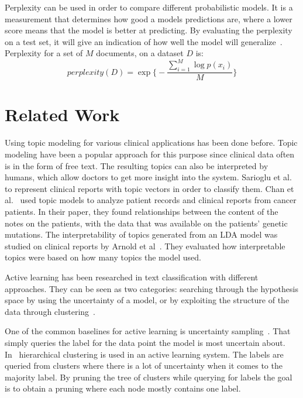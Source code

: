 Perplexity can be used in order to compare different probabilistic models. 
It is a measurement that determines how good a models predictions are, where a lower score means that the model is better at predicting.
By evaluating the perplexity on a test set, it will give an indication of how well the model will generalize~\cite{blei2003latent}.
Perplexity for a set of $M$ documents, on a dataset $D$ is:
\begin{equation}
    perplexity(D) = \exp \big \{ -\frac{\sum_{i=1}^M \log p(x_i) }{M} \big \}
\end{equation}

\section{Related Work}

Using topic modeling for various clinical applications has been done before.
Topic modeling have been a popular approach for this purpose since clinical data often is in the form of free text.
The resulting topics can also be interpreted by humans, which allow doctors to get more insight into the system.
Sarioglu et al\@.~\cite{sarioglu2013topic} to represent clinical reports with topic vectors in order to classify them.
Chan et al\@.~\cite{chan2013empirical} used topic models to analyze patient records and clinical reports from cancer patients.
In their paper, they found relationships between the content of the notes on the patients, with the data that was available on the patients' genetic mutations.
The interpretability of topics generated from an LDA model was studied on clinical reports by Arnold et al~\cite{arnold2016evaluating}.
They evaluated how interpretable topics were based on how many topics the model used.

Active learning has been researched in text classification with different approaches.
They can be seen as two categories: searching through the hypothesis space by using the uncertainty of a model, or by exploiting the structure of the data through clustering~\cite{dasgupta2008hierarchical}.

One of the common baselines for active learning is uncertainty sampling~\cite{lewis1994sequential}.
That simply queries the label for the data point the model is most uncertain about.
In~\cite{dasgupta2008hierarchical} hierarchical clustering is used in an active learning system.
The labels are queried from clusters where there is a lot of uncertainty when it comes to the majority label.
By pruning the tree of clusters while querying for labels the goal is to obtain a pruning where each node mostly contains one label.

